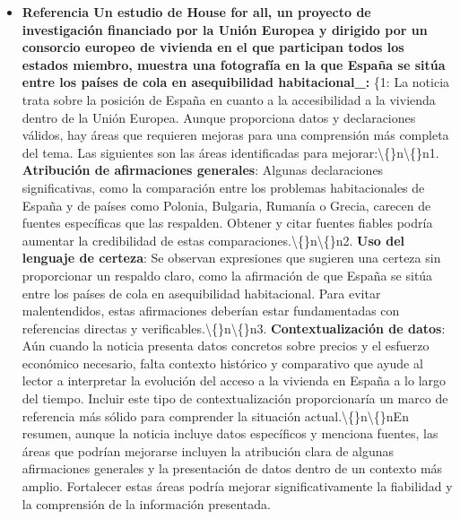 \documentclass[10pt,a4paper]{article}
\begin{document}
\begin{itemize}[leftmargin=*]
            \item \textbf{Referencia Un estudio de House for all, un proyecto de investigaci\'{o}n financiado por la Uni\'{o}n Europea y dirigido por un consorcio europeo de vivienda en el que participan todos los estados miembro, muestra una fotograf\'{i}a en la que Espa\~{n}a se sit\'{u}a entre los pa\'{i}ses de cola en {}asequibilidad{} habitacional\_:} \{{}1{}: {}La noticia trata sobre la posici\'{o}n de Espa\~{n}a en cuanto a la accesibilidad a la vivienda dentro de la Uni\'{o}n Europea. Aunque proporciona datos y declaraciones v\'{a}lidos, hay \'{a}reas que requieren mejoras para una comprensi\'{o}n m\'{a}s completa del tema. Las siguientes son las \'{a}reas identificadas para mejorar:\textbackslash\{\}n\textbackslash\{\}n1. \textbf{Atribuci\'{o}n de afirmaciones generales}: Algunas declaraciones significativas, como la comparaci\'{o}n entre los problemas habitacionales de Espa\~{n}a y de pa\'{i}ses como Polonia, Bulgaria, Ruman\'{i}a o Grecia, carecen de fuentes espec\'{i}ficas que las respalden. Obtener y citar fuentes fiables podr\'{i}a aumentar la credibilidad de estas comparaciones.\textbackslash\{\}n\textbackslash\{\}n2. \textbf{Uso del lenguaje de certeza}: Se observan expresiones que sugieren una certeza sin proporcionar un respaldo claro, como la afirmaci\'{o}n de que {}Espa\~{n}a se sit\'{u}a entre los pa\'{i}ses de cola en {}asequibilidad{} habitacional{}. Para evitar malentendidos, estas afirmaciones deber\'{i}an estar fundamentadas con referencias directas y verificables.\textbackslash\{\}n\textbackslash\{\}n3. \textbf{Contextualizaci\'{o}n de datos}: A\'{u}n cuando la noticia presenta datos concretos sobre precios y el esfuerzo econ\'{o}mico necesario, falta contexto hist\'{o}rico y comparativo que ayude al lector a interpretar la evoluci\'{o}n del acceso a la vivienda en Espa\~{n}a a lo largo del tiempo. Incluir este tipo de contextualizaci\'{o}n proporcionar\'{i}a un marco de referencia m\'{a}s s\'{o}lido para comprender la situaci\'{o}n actual.\textbackslash\{\}n\textbackslash\{\}nEn resumen, aunque la noticia incluye datos espec\'{i}ficos y menciona fuentes, las \'{a}reas que podr\'{i}an mejorarse incluyen la atribuci\'{o}n clara de algunas afirmaciones generales y la presentaci\'{o}n de datos dentro de un contexto m\'{a}s amplio. Fortalecer estas \'{a}reas podr\'{i}a mejorar significativamente la fiabilidad y la comprensi\'{o}n de la informaci\'{o}n presentada.{}

\end{itemize}
\end{document}
